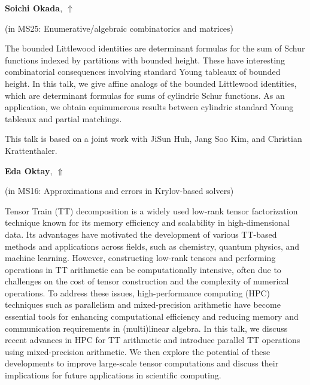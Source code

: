 \documentclass[ILAS2025-program.tex]{subfiles}
\begin{document}
\hypertarget{down0181}{}\begin{ilasabstract}
    
\textbf{Soichi Okada},  \hfill \hyperlink{up0181}{$\Uparrow$}
    
    
(in {\color{mstitle}MS25: Enumerative/algebraic combinatorics and matrices})
        
\mtskip
    The bounded Littlewood identities are determinant formulas for 
the sum of Schur functions indexed by partitions with bounded height. 
These have interesting combinatorial consequences involving 
standard Young tableaux of bounded height. In this talk, we 
give affine analogs of the bounded Littlewood identities, which 
are determinant formulas for sums of cylindric Schur functions. 
As an application, we obtain equinumerous results between cylindric 
standard Young tableaux and partial matchings.

This talk is based on a joint work with JiSun Huh, Jang Soo Kim, 
and Christian Krattenthaler.

\end{ilasabstract}
    

\hypertarget{down0343}{}\begin{ilasabstract}
    
\textbf{Eda Oktay},  \hfill \hyperlink{up0343}{$\Uparrow$}
    
    
(in {\color{mstitle}MS16: Approximations and errors in Krylov-based solvers})
        
\mtskip
    Tensor Train (TT) decomposition is a widely used low-rank tensor factorization technique known for its memory efficiency and scalability in high-dimensional data. Its advantages have motivated the development of various TT-based methods and applications across fields, such as chemistry, quantum physics, and machine learning. However, constructing low-rank tensors and performing operations in TT arithmetic can be computationally intensive, often due to challenges on the cost of tensor construction and the complexity of numerical operations. To address these issues, high-performance computing (HPC) techniques such as parallelism and mixed-precision arithmetic have become essential tools for enhancing computational efficiency and reducing memory and communication requirements in (multi)linear algebra. In this talk, we discuss recent advances in HPC for TT arithmetic and introduce parallel TT operations using mixed-precision arithmetic. We then explore the potential of these developments to improve large-scale tensor computations and discuss their implications for future applications in scientific computing.
\end{ilasabstract}
    
\end{document}
